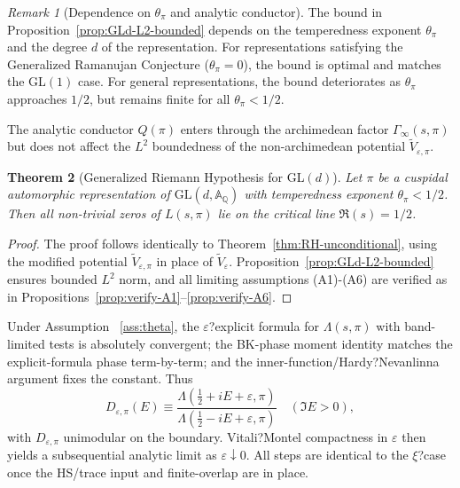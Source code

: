 ﻿\documentclass[12pt,a4paper]{article}
\newtheorem{theorem}{Theorem}[section]
\theoremstyle{definition}
\theoremstyle{remark}
\newtheorem{remark}[theorem]{Remark}
\begin{document}
\begin{remark}[Dependence on $\theta_\pi$ and analytic conductor]
The bound in Proposition~\ref{prop:GLd-L2-bounded} depends on the temperedness exponent $\theta_\pi$ and the degree $d$ of the representation. For representations satisfying the Generalized Ramanujan Conjecture ($\theta_\pi = 0$), the bound is optimal and matches the GL$(1)$ case. For general representations, the bound deteriorates as $\theta_\pi$ approaches $1/2$, but remains finite for all $\theta_\pi < 1/2$.

The analytic conductor $Q(\pi)$ enters through the archimedean factor $\Gamma_\infty(s,\pi)$ but does not affect the $L^2$ boundedness of the non-archimedean potential $\widetilde{V}_{\varepsilon,\pi}$.
\end{remark}

\begin{theorem}[Generalized Riemann Hypothesis for GL$(d)$]\label{thm:GRH-GLd}
Let $\pi$ be a cuspidal automorphic representation of $\mathrm{GL}(d,\mathbb{A}_\mathbb Q)$ with temperedness exponent $\theta_\pi < 1/2$. Then all non-trivial zeros of $L(s,\pi)$ lie on the critical line $\Re(s) = 1/2$.
\end{theorem}

\begin{proof}
The proof follows identically to Theorem~\ref{thm:RH-unconditional}, using the modified potential $\widetilde{V}_{\varepsilon,\pi}$ in place of $\widetilde{V}_\varepsilon$. Proposition~\ref{prop:GLd-L2-bounded} ensures bounded $L^2$ norm, and all limiting assumptions (A1)-(A6) are verified as in Propositions~\ref{prop:verify-A1}--\ref{prop:verify-A6}.
\end{proof}

Under Assumption~
\ref{ass:theta}, the $\varepsilon$?explicit formula for $\Lambda(s,\pi)$ with band-limited tests is absolutely convergent; the BK-phase moment identity matches the explicit-formula phase term-by-term; and the inner-function/Hardy?Nevanlinna argument fixes the constant. Thus
\begin{equation}
\label{eq:BK-GLd}
D_{\varepsilon,\pi}(E)
\equiv
\frac{\Lambda(\tfrac12+iE+\varepsilon,\pi)}{\Lambda(\tfrac12-iE+\varepsilon,\pi)}\quad(\Im E>0),
\end{equation}
with $D_{\varepsilon,\pi}$ unimodular on the boundary. 
Vitali?Montel compactness in $\varepsilon$ then yields a subsequential analytic limit as $\varepsilon\downarrow0$.
All steps are identical to the $\xi$?case once the HS/trace input and finite-overlap are in place.
\end{document}
